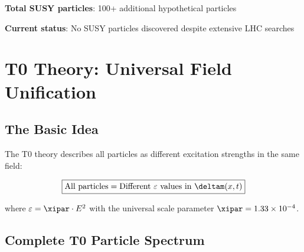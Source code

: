 	\textbf{Total SUSY particles}: 100+ additional hypothetical particles
	
	\textbf{Current status}: No SUSY particles discovered despite extensive LHC searches
	
	\section{T0 Theory: Universal Field Unification}
	
	\subsection{The Basic Idea}
	
	The T0 theory describes all particles as different excitation strengths in the same field:
	
	\begin{equation}
		\boxed{\text{All particles} = \text{Different } \varepsilon \text{ values in } \deltam(x,t)}
		\label{eq:universal_particle_principle}
	\end{equation}
	
	where $\varepsilon = \xipar \cdot E^2$ with the universal scale parameter $\xipar = 1.33 \times 10^{-4}$.
	
	\subsection{Complete T0 Particle Spectrum}
	
